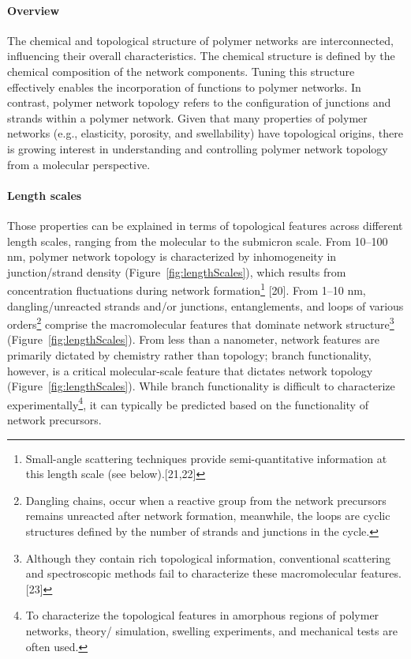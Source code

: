 \paragraph{Overview} The chemical and topological structure of polymer networks are interconnected, influencing their overall characteristics.
The chemical structure is defined by the chemical composition of the network components. 
Tuning this structure effectively enables the incorporation of functions to polymer networks.
In contrast, polymer network topology refers to the configuration of junctions and strands within a polymer network.
Given that many properties of polymer networks (e.g., elasticity, porosity, and swellability) have topological origins, there is growing interest in understanding and controlling polymer network topology from a molecular perspective\citep{guPolymerNetworksPlastics2020}.

\paragraph{Length scales} Those properties can be explained in terms of topological features across different length scales, ranging from the molecular to the submicron scale.
From 10–100 nm, polymer network topology is characterized by inhomogeneity in junction/strand density (Figure~\ref{fig:lengthScales}), which results from concentration fluctuations during network formation\footnote{Small-angle scattering techniques provide semi-quantitative information at this length scale (see below).[21,22]} [20].
From 1–10 nm, dangling/unreacted strands and/or junctions, entanglements, and loops of various orders\footnote{Dangling chains, occur when a reactive group from the network precursors remains unreacted after network formation, meanwhile, the loops are cyclic structures defined by the number of strands and junctions in the cycle. 
} comprise the macromolecular features that dominate network structure\footnote{Although they contain rich topological information, conventional scattering and spectroscopic methods fail to characterize these macromolecular features.[23]} (Figure~\ref{fig:lengthScales}). 
From less than a nanometer, network features are primarily dictated by chemistry rather than topology; branch functionality, however, is a critical molecular-scale feature that dictates network topology (Figure~\ref{fig:lengthScales}). 
While branch functionality is difficult to characterize experimentally\footnote{To characterize the topological features in amorphous regions of polymer networks, theory/ simulation, swelling experiments, and mechanical tests are often used.}, it can typically be predicted based on the functionality of network precursors\citep{guPolymerNetworksPlastics2020}.

